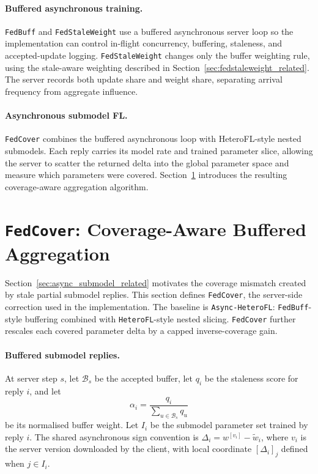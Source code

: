 \paragraph{Buffered asynchronous training.}
\texttt{FedBuff} and \texttt{FedStaleWeight} use a buffered asynchronous server loop so the implementation can control in-flight concurrency, buffering, staleness, and accepted-update logging. \texttt{FedStaleWeight} changes only the buffer weighting rule, using the stale-aware weighting described in Section~\ref{sec:fedstaleweight_related}. The server records both update share and weight share, separating arrival frequency from aggregate influence.

\paragraph{Asynchronous submodel FL.}
\texttt{FedCover} combines the buffered asynchronous loop with HeteroFL-style nested submodels. Each reply carries its model rate and trained parameter slice, allowing the server to scatter the returned delta into the global parameter space and measure which parameters were covered. Section~\ref{sec:fedcover_impl} introduces the resulting coverage-aware aggregation algorithm.

\FloatBarrier
\section{\texttt{FedCover}: Coverage-Aware Buffered Aggregation}
\label{sec:fedcover_impl}

Section~\ref{sec:async_submodel_related} motivates the coverage mismatch created by stale partial submodel replies. This section defines \texttt{FedCover}, the server-side correction used in the implementation. The baseline is \texttt{Async-HeteroFL}: \texttt{FedBuff}-style buffering combined with \texttt{HeteroFL}-style nested slicing. \texttt{FedCover} further rescales each covered parameter delta by a capped inverse-coverage gain.

\paragraph{Buffered submodel replies.}
At server step \(s\), let \(\mathcal{B}_s\) be the accepted buffer, let \(q_i\) be the staleness score for reply \(i\), and let
\[
    \alpha_i =
    \frac{q_i}{\sum_{u\in\mathcal{B}_s}q_u}
\]
be its normalised buffer weight. Let \(I_i\) be the submodel parameter set trained by reply \(i\). The shared asynchronous sign convention is \(\Delta_i=w^{[v_i]}-\tilde{w}_i\), where \(v_i\) is the server version downloaded by the client, with local coordinate \([\Delta_i]_j\) defined when \(j \in I_i\).

